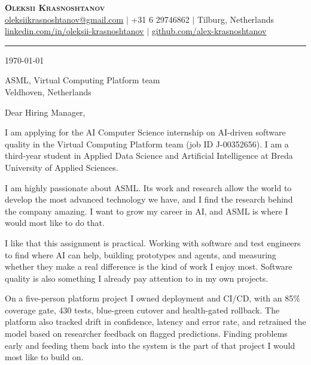 \documentclass[letterpaper,11pt]{article}
\begin{document}
\begin{center}
    \textbf{\Huge \scshape Oleksii Krasnoshtanov} \\ \vspace{1pt}
    \small
    \href{mailto:oleksiikrasnoshtanov@gmail.com}{\underline{oleksiikrasnoshtanov@gmail.com}} $|$
    +31 6 29746862 $|$
    Tilburg, Netherlands \\ \vspace{2pt}
    \href{https://www.linkedin.com/in/oleksii-krasnoshtanov/}{\underline{linkedin.com/in/oleksii-krasnoshtanov}} $|$
    \href{https://github.com/alex-krasnoshtanov}{\underline{github.com/alex-krasnoshtanov}}
\end{center}
\vspace{-4pt}\noindent\rule{\textwidth}{0.4pt}

\today

ASML, Virtual Computing Platform team \\
Veldhoven, Netherlands

Dear Hiring Manager,

I am applying for the AI \textbar{} Computer Science internship on AI-driven
software quality in the Virtual Computing Platform team (job ID J-00352656).
I am a third-year student in Applied Data Science and Artificial Intelligence
at Breda University of Applied Sciences.

I am highly passionate about ASML. Its work and research allow the world to
develop the most advanced technology we have, and I find the research behind
the company amazing. I want to grow my career in AI, and ASML is where I would
most like to do that.

I like that this assignment is practical. Working with software and test
engineers to find where AI can help, building prototypes and agents, and
measuring whether they make a real difference is the kind of work I enjoy most.
Software quality is also something I already pay attention to in my own
projects.

On a five-person platform project I owned deployment and CI/CD, with an 85\%
coverage gate, 430 tests, blue-green cutover and health-gated rollback. The
platform also tracked drift in confidence, latency and error rate, and
retrained the model based on researcher feedback on flagged predictions.
Finding problems early and feeding them back into the system is the part of
that project I would most like to build on.
\end{document}
